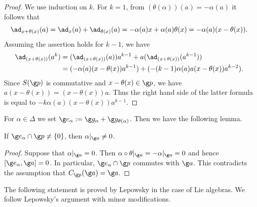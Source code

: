 \documentclass[11pt]{amsart}
\begin{document}
\begin{proof}
 We use induction on $k$. For $k=1$, from $(\theta(\alpha))(a)=-\alpha(a)$ it follows that
\[ \ad_{x+\theta(x)}(a)=\ad_{x}(a)+\ad_{\theta(x)}(a)=-\alpha(a)x+\alpha(a)\theta(x)=-\alpha(a)(x-\theta(x)).
\] 
Assuming the assertion holds for $k-1$, we have
\begin{align*}
\ad_{(x+\theta(x))}(a^k)&=(\ad_{(x+\theta(x))}(a))a^{k-1}+a(\ad_{(x+\theta(x))}(a^{k-1}))\\
&=(-\alpha(a)(x-\theta(x))a^{k-1})+(-(k-1)\alpha(a)a(x-\theta(x))a^{k-2}).
\end{align*}
Since $S(\g p)$ is commutative and $x-\theta(x)\in \g p$, we have $a(x-\theta(x))=(x-\theta(x))a$. Thus the right hand side of the latter formula is equal to $-k\alpha(a)(x-\theta(x))a^{k-1}$.
\end{proof}
For $\alpha \in \Delta$ we set $\g e_\alpha:=\g g_\alpha+\g g_{\theta(\alpha)}$. Then we have the following lemma.
\begin{lem}\label{alpha-is-nonzero}
 If $\g e_\alpha\cap \g p\neq \lbrace 0\rbrace$, then $\alpha|_{\g a}\neq 0$.
\end{lem}
\begin{proof}
Suppose that $\alpha|_{\g a}= 0$. Then $\alpha\circ \theta|_{\g a}=-\alpha|_{\g a}=0$ and hence $[\g e_\alpha,\g a]=0$. In particular,  $\g e_\alpha \cap \g p$ commutes with $\g a$. This contradicts the assumption that $C_{\g p}(\g a)=\g a$.
\end{proof}


The following statement is proved by Lepowsky \cite{lepowsky1975harish} in the case of Lie algebras. We follow Lepowsky's argument with minor modifications.
\end{document}
